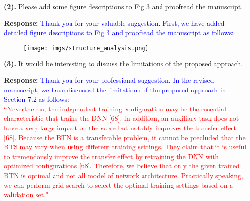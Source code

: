 \documentclass[12pt,journal,onecolumn]{IEEEtran}
\begin{document}
\textbf{(2).} Please add some figure descriptions to Fig 3 and proofread the manuscript.

\textbf{Response:} \textcolor{blue}{Thank you for your valuable suggestion. 
First, we have added detailed figure descriptions to Fig 3 and proofread the manuscript as follows: 
}

\begin{figure}[H]
	\centering 
	\texttt{[image: imgs/structure\_analysis.png]}
\end{figure}

\vspace{8pt} 


\textbf{(3).} It would be interesting to discuss the limitations of the proposed approach.

\textbf{Response:} \textcolor{blue}{Thank you for your professional suggestion. 
In the revised manuscript, we have discussed the limitations of the proposed approach in Section 7.2 as follows: \\
}
\textcolor{red}{
``Nevertheless, the independent training configuration may be the essential characteristic that trains the DNN [68]. 
In addition, an auxiliary task does not have a very large impact on the score but notably improves the transfer effect [68]. 
Because the BTN is a transferable problem, it cannot be precluded that the BTS may vary when using different training settings. 
They claim that it is useful to tremendously improve the transfer effect by retraining the DNN with optimized configurations [68].
Therefore, we believe that only the given trained BTN is optimal and not all model of network architecture. Practically speaking, we can perform grid search to select the optimal training settings based on a validation set."
}
\vspace{8pt} 


\vspace{8pt} 


\vspace{8pt}


%
\end{document}
